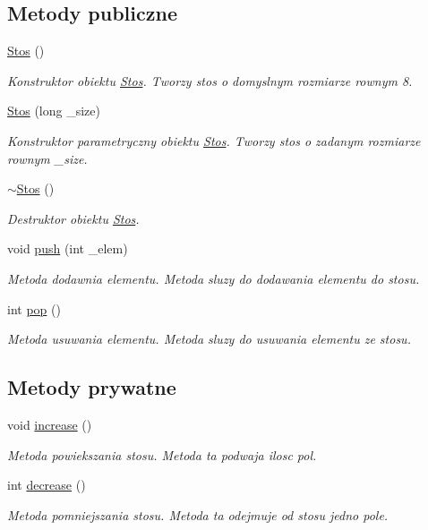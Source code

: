 \subsection*{Metody publiczne}
\begin{DoxyCompactItemize}
\item 
\hyperlink{struct_stos_a1de3b50386d5dfb56ddece17d0ea2389}{Stos} ()
\begin{DoxyCompactList}\small\item\em Konstruktor obiektu \hyperlink{struct_stos}{Stos}. Tworzy stos o domyslnym rozmiarze rownym 8. \end{DoxyCompactList}\item 
\hyperlink{struct_stos_a6606affc11eed2b059b8caf287ffca25}{Stos} (long \-\_\-size)
\begin{DoxyCompactList}\small\item\em Konstruktor parametryczny obiektu \hyperlink{struct_stos}{Stos}. Tworzy stos o zadanym rozmiarze rownym \-\_\-size. \end{DoxyCompactList}\item 
\hyperlink{struct_stos_af9a198e2540e18adcc0b5259105fd78e}{$\sim$\-Stos} ()
\begin{DoxyCompactList}\small\item\em Destruktor obiektu \hyperlink{struct_stos}{Stos}. \end{DoxyCompactList}\item 
void \hyperlink{struct_stos_afd5802e405946328cccca3eed676b493}{push} (int \-\_\-elem)
\begin{DoxyCompactList}\small\item\em Metoda dodawnia elementu. Metoda sluzy do dodawania elementu do stosu. \end{DoxyCompactList}\item 
int \hyperlink{struct_stos_aabb14b8a389c55da6e2b50fbb179ed56}{pop} ()
\begin{DoxyCompactList}\small\item\em Metoda usuwania elementu. Metoda sluzy do usuwania elementu ze stosu. \end{DoxyCompactList}\end{DoxyCompactItemize}
\subsection*{Metody prywatne}
\begin{DoxyCompactItemize}
\item 
void \hyperlink{struct_stos_aaf6e4717d1983c5351c9f5e9797368d3}{increase} ()
\begin{DoxyCompactList}\small\item\em Metoda powiekszania stosu. Metoda ta podwaja ilosc pol. \end{DoxyCompactList}\item 
int \hyperlink{struct_stos_a1054dda0231b2516b6a04298801c0b27}{decrease} ()
\begin{DoxyCompactList}\small\item\em Metoda pomniejszania stosu. Metoda ta odejmuje od stosu jedno pole. \end{DoxyCompactList}\end{DoxyCompactItemize}
